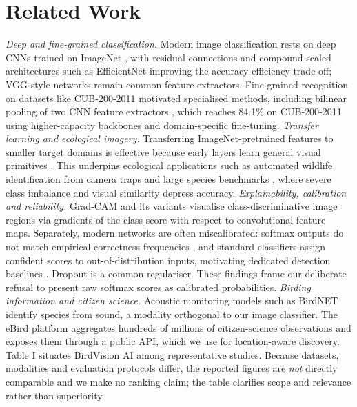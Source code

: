 \documentclass[conference]{IEEEtran}
\begin{document}
\section{Related Work}
\textit{Deep and fine-grained classification.} Modern image classification rests on deep CNNs trained on ImageNet \cite{ref2}, with residual connections \cite{ref3} and compound-scaled architectures such as EfficientNet \cite{ref4} improving the accuracy-efficiency trade-off; VGG-style networks \cite{ref5} remain common feature extractors. Fine-grained recognition on datasets like CUB-200-2011 \cite{ref6} motivated specialised methods, including bilinear pooling of two CNN feature extractors \cite{ref8}, which reaches 84.1\% on CUB-200-2011 using higher-capacity backbones and domain-specific fine-tuning.
\textit{Transfer learning and ecological imagery.} Transferring ImageNet-pretrained features to smaller target domains is effective because early layers learn general visual primitives \cite{ref9}. This underpins ecological applications such as automated wildlife identification from camera traps \cite{ref18} and large species benchmarks \cite{ref7}, where severe class imbalance and visual similarity depress accuracy.
\textit{Explainability, calibration and reliability.} Grad-CAM \cite{ref11} and its variants \cite{ref12} visualise class-discriminative image regions via gradients of the class score with respect to convolutional feature maps. Separately, modern networks are often miscalibrated: softmax outputs do not match empirical correctness frequencies \cite{ref13}, and standard classifiers assign confident scores to out-of-distribution inputs, motivating dedicated detection baselines \cite{ref14}. Dropout \cite{ref10} is a common regulariser. These findings frame our deliberate refusal to present raw softmax scores as calibrated probabilities.
\textit{Birding information and citizen science.} Acoustic monitoring models such as BirdNET \cite{ref15} identify species from sound, a modality orthogonal to our image classifier. The eBird platform \cite{ref16} aggregates hundreds of millions of citizen-science observations and exposes them through a public API, which we use for location-aware discovery.
Table I situates BirdVision AI among representative studies. Because datasets, modalities and evaluation protocols differ, the reported figures are \textit{not} directly comparable and we make no ranking claim; the table clarifies scope and relevance rather than superiority.
\end{document}
